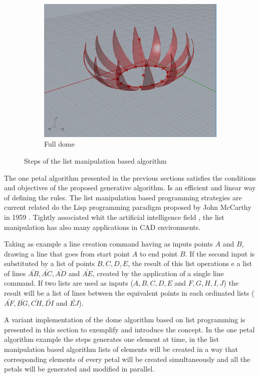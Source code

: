 \documentclass[preprint,12pt,3p]{elsarticle}
\begin{document}
\begin{figure}
\begin{subfigure}{0.3\textwidth}
  \includegraphics[width=.9\linewidth]{a02s09.png}
  \caption{Full dome}
  \label{fig:a02s09}
\end{subfigure}


\caption{Steps of the list manipulation based algorithm}
\label{fig:a02steps}
\end{figure}

The one petal algorithm presented in the previous sections satisfies the conditions and objectives of the proposed generative algorithm. Is an efficient and linear way of defining the rules. The list manipulation based programming strategies are current related do the Lisp programming paradigm proposed by John McCarthy in 1959 \cite{McCarthy1960}. Tightly associated whit the artificial intelligence field \cite{Steele:1996:EL:234286.1057818}, the list manipulation has also many applications in CAD environments. 

Taking as example a line creation command having as inputs points $A$ and $B$, drawing a line that goes from start point $A$ to end point $B$. If the second input is substituted by a list of points $B, C, D, E$, the result of this list operations e a list of lines $\bar{AB}, \bar{AC}, \bar{AD}$ and $\bar{AE}$, created by the application of a single line command. If two lists are used as inputs ($A, B, C, D, E$ and $F, G, H, I, J$) the result will be a list of lines between the equivalent points in each ordinated lists ($\bar{AF}, \bar{BG}, \bar{CH}, \bar{DI}$ and $\bar{EJ}$).

A variant implementation of the dome algorithm based on list programming is presented in this section to exemplify and introduce the concept. In the one petal algorithm example the steps generates one element at time, in the list manipulation based algorithm lists of elements will be created in a way that corresponding elements of every petal will be created simultaneously and all the petals will be generated and modified in parallel.
\end{document}

